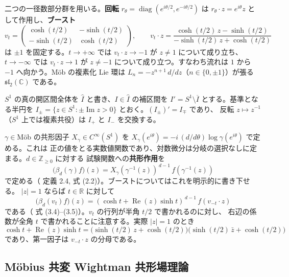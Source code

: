 \documentclass[11pt,a4paper]{article}
\newcommand{\Mob}{\mathrm{M\text{ö}b}}
\newcommand{\Circ}{S^{1}}
\newcommand{\abs}[1]{\lvert #1 \rvert}
\theoremstyle{definition}
\begin{document}
二つの一径数部分群を用いる。\textbf{回転} $r_\theta = \operatorname{diag}(e^{i\theta/2}, e^{-i\theta/2})$
は $r_\theta \cdot z = e^{i\theta}z$ として作用し、\textbf{ブースト}
\[
  v_t = \begin{pmatrix} \cosh(t/2) & -\sinh(t/2) \\ -\sinh(t/2) & \cosh(t/2) \end{pmatrix},
  \qquad
  v_t \cdot z = \frac{\cosh(t/2)\, z - \sinh(t/2)}{-\sinh(t/2)\, z + \cosh(t/2)}
\]
は $\pm 1$ を固定する。$t \to +\infty$ では $v_t \cdot z \to -1$ が $z \ne 1$ について成り立ち、
$t \to -\infty$ では $v_t \cdot z \to 1$ が $z \ne -1$ について成り立つ。すなわち流れは
$1$ から $-1$ へ向かう。$\Mob$ の複素化 Lie 環は
$L_n = -z^{n+1}\, d/dz$（$n \in \{0, \pm 1\}$）が張る $\mathfrak{sl}_2(\mathbb{C})$ である。

$\Circ$ の真の開区間全体を $\hat{I}$ と書き、$I \in \hat{I}$ の補区間を
$I' = \Circ \setminus \overline{I}$ とする。基準となる半円を
$I_\pm = \{z \in \Circ : \pm\operatorname{Im} z > 0\}$ とおく。$(I_\pm)' = I_\mp$ であり、
反転 $z \mapsto z^{-1}$（$\Circ$ 上では複素共役）は $I_+$ と $I_-$ を交換する。

$\gamma \in \Mob$ の共形因子 $X_\gamma \in C^\infty(\Circ)$ を
$X_\gamma(e^{i\theta}) = -i\, (d/d\theta) \log \gamma(e^{i\theta})$ で定める。これは
正の値をとる実数値関数であり、対数微分は分岐の選択なしに定まる。$d \in \mathbb{Z}_{\ge 0}$ に対する
試験関数への\textbf{共形作用}を
\begin{equation}
  \label{eq:beta}
  \bigl(\beta_d(\gamma) f\bigr)(z) = X_\gamma(\gamma^{-1}(z))^{\,d-1}\, f(\gamma^{-1}(z))
\end{equation}
で定める（\cite{T26} 定義 2.4, 式 (2.2)）。ブーストについてはこれを明示的に書き下せる。
$\abs{z} = 1$ ならば $t \in \mathbb{R}$ に対して
\begin{equation}
  \label{eq:beta-boost}
  \bigl(\beta_d(v_t) f\bigr)(z) = (\cosh t + \operatorname{Re}(z) \sinh t)^{\,d-1}\, f(v_{-t}\cdot z)
\end{equation}
である（\cite{T26} 式 (3.4)--(3.5)）。$v_t$ の行列が半角 $t/2$ で書かれるのに対し、
右辺の係数が全角 $t$ で書かれることに注意する。実際 $\abs{z} = 1$ のとき
\[
  \cosh t + \operatorname{Re}(z)\sinh t
  = \bigl(\sinh(t/2)\, z + \cosh(t/2)\bigr)\bigl(\sinh(t/2)\, \bar{z} + \cosh(t/2)\bigr)
\]
であり、第一因子は $v_{-t}\cdot z$ の分母である。

\subsection{M\"obius 共変 Wightman 共形場理論}
\end{document}
